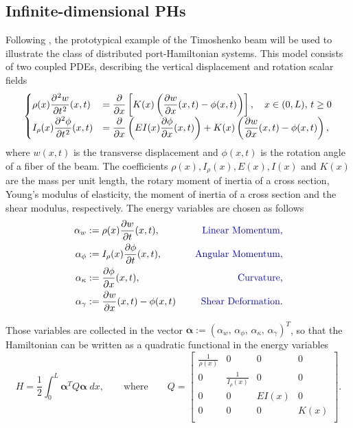 \documentclass[preprint,12pt]{elsarticle}
\newcommand{\RevOne}[1]{\textcolor{blue!80!black}{#1}}
\begin{document}
\subsection{Infinite-dimensional PHs}
Following \cite{BookZwart}, the prototypical example of the Timoshenko beam will be used to illustrate the class of distributed port-Hamiltonian systems. This model consists of two coupled PDEs, describing the vertical displacement and rotation scalar fields
\begin{equation}
\label{eq:TimoModel}
\begin{cases}
\displaystyle \rho(x) \diffp[2]{w}{t}(x,t) &= \displaystyle \diffp{}{x} \left[K(x) \left(\diffp{w}{x}(x,t) - \phi(x,t)\right)\right], \quad x \in (0,L),\, t \ge 0 \\
\displaystyle I_{\rho}(x) \diffp[2]{\phi}{t}(x,t) &= \displaystyle \diffp{}{x} \left(EI(x) \diffp{ \phi}{x}(x,t)\right) + K(x) \left(\diffp{w}{x}(x,t) - \phi(x,t) \right),
\end{cases}
\end{equation}
where ${w}(x,t)$ is the transverse displacement and $\phi(x,t)$ is the rotation angle of a fiber of the beam. The coefficients $\rho(x), I_{\rho}(x), E(x), I(x)$ and $K(x)$ are the mass per unit length, the rotary moment of inertia of a cross section, Young's modulus of elasticity, the moment of inertia of a cross section and the shear modulus, respectively. The energy variables are chosen as follows
\begin{equation}
\begin{aligned}
\alpha_{w} &:= \rho(x) \diffp{w}{t}(x,t), \quad &\text{\RevOne{Linear Momentum,}} \\
\alpha_{\phi} &:= I_{\rho}(x) \diffp{\phi}{t}(x,t), \quad &\text{\RevOne{Angular Momentum,}} \\
\alpha_{\kappa} &:= \diffp{\phi}{x}(x,t), \quad &\text{\RevOne{Curvature,}} \\
\alpha_{\gamma} &:= \diffp{w}{x}(x,t) - \phi(x,t) \quad &\text{\RevOne{Shear Deformation}}. \\
\end{aligned}
\end{equation}

Those variables are collected in the vector $\bm{\alpha} := (\alpha_{w}, \, \alpha_{\phi}, \, \alpha_{\kappa}, \, \alpha_{\gamma} )^T $, so that the Hamiltonian can be written as a quadratic functional in the energy variables 
\begin{equation}
H = \frac{1}{2} \int_{0}^{L} \bm{\alpha}^T Q \bm{\alpha} \; dx,
\qquad \text{where} \qquad
Q = 
\begin{bmatrix}
\frac{1}{\rho(x)} & 0 & 0 & 0 \\
0 & \frac{1}{I_{\rho}(x)} & 0 & 0 \\
0 & 0 & EI(x) & 0 \\
0 & 0 & 0 & K(x) \\
\end{bmatrix}.
\end{equation}
\end{document}
